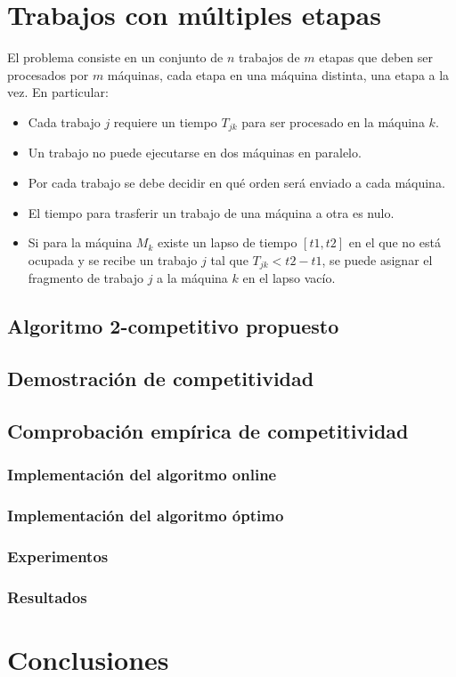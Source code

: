 \documentclass[12pt,letterpaper]{article}
\begin{document}
\section{Trabajos con múltiples etapas}
El problema consiste en un conjunto de $n$ trabajos de $m$ etapas que deben ser procesados por $m$ máquinas, cada etapa en una máquina distinta, una etapa a la vez. En particular:

\begin{itemize}
\item Cada trabajo $j$ requiere un tiempo $T_{jk}$ para ser procesado en la máquina $k$.
\item Un trabajo no puede ejecutarse en dos máquinas en paralelo.
\item Por cada trabajo se debe decidir en qué orden será enviado a cada máquina.
\item El tiempo para trasferir un trabajo de una máquina a otra es nulo.
\item Si para la máquina $M_{k}$ existe un lapso de tiempo $[t1, t2]$ en el que no está ocupada y se recibe un trabajo $j$ tal que $T_{jk} < t2 - t1$, se puede asignar el fragmento de trabajo $j$ a la máquina $k$ en el lapso vacío.
\end{itemize}

\subsection{Algoritmo 2-competitivo propuesto}
\subsection{Demostración de competitividad}
\subsection{Comprobación empírica de competitividad}
\subsubsection{Implementación del algoritmo online}
\subsubsection{Implementación del algoritmo óptimo}
\subsubsection{Experimentos}
\subsubsection{Resultados}

\section{Conclusiones}

\end{document}
